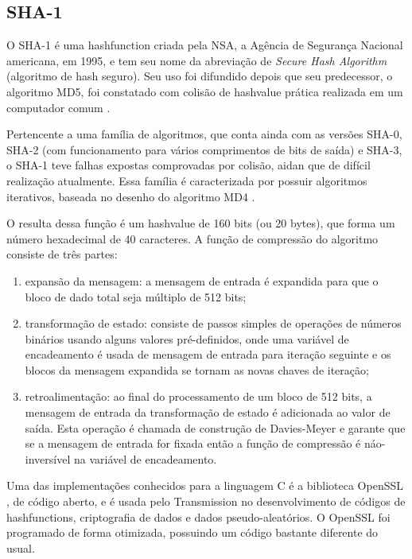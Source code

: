 
\subsection*{SHA-1}

O SHA-1 é uma \gls*{hashfunction} criada pela NSA, a Agência de Segurança Nacional
americana, em 1995, e tem seu nome da abreviação de \emph{Secure Hash Algorithm}
(algoritmo de hash seguro). Seu uso foi difundido depois que seu predecessor, o
algoritmo MD5, foi constatado com colisão de \gls*{hashvalue} prática realizada em um
computador comum \cite{report:md5-attack}.

Pertencente a uma família de algoritmos, que conta ainda com as versões SHA-0, SHA-2
(com funcionamento para vários comprimentos de bits de saída) e SHA-3, o SHA-1 teve
falhas expostas comprovadas por colisão, aidan que de difícil realização atualmente.
Essa família é caracterizada por possuir algoritmos iterativos, baseada no desenho do
algoritmo MD4 \cite{report:md4}.

O resulta dessa função é um \gls*{hashvalue} de 160 bits (ou 20 bytes), que forma um
número hexadecimal de 40 caracteres. A função de compressão do algoritmo consiste de
três partes:

\begin{enumerate}
    \item expansão da mensagem: a mensagem de entrada é expandida para que o bloco de
        dado total seja múltiplo de 512 bits;

    \item transformação de estado: consiste de passos simples de operações de números
        binários usando alguns valores pré-definidos, onde uma variável de encadeamento
        é usada de mensagem de entrada para iteração seguinte e os blocos da mensagem
        expandida se tornam as novas chaves de iteração;

    \item retroalimentação: ao final do processamento de um bloco de 512 bits, a
        mensagem de entrada da transformação de estado é adicionada ao valor de saída.
        Esta operação é chamada de construção de Davies-Meyer e garante que se a
        mensagem de entrada for fixada então a função de compressão é náo-inversível na
        variável de encadeamento.
\end{enumerate}

Uma das implementações conhecidos para a linguagem C é a biblioteca OpenSSL
\cite{site:openssl}, de código aberto, e é usada pelo Transmission no desenvolvimento de
códigos de \glspl*{hashfunction}, criptografia de dados e dados pseudo-aleatórios. O
OpenSSL foi programado de forma otimizada, possuindo um código bastante diferente do
usual.

